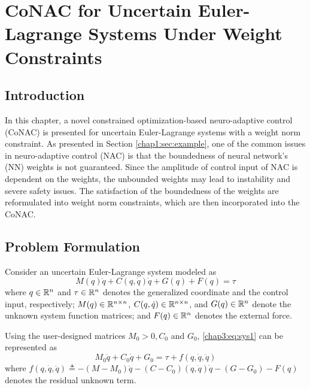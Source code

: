 
\chapter{
    CoNAC for Uncertain Euler-Lagrange Systems Under Weight Constraints
} \label{chapter3}

\section{Introduction} 

In this chapter, a novel constrained optimization-based neuro-adaptive control (Co\allowbreak NAC) is presented for uncertain Euler-Lagrange systems with a weight norm constraint. 
As presented in Section \ref{chap1:sec:example}, one of the common issues in neuro-adaptive control (NAC) is that the boundedness of neural network’s (NN) weights is not guaranteed.
Since the amplitude of control input of NAC is dependent on the weights, the unbounded weights may lead to instability and severe safety issues. 
The satisfaction of the boundedness of the weights are reformulated into weight norm constraints, which are then incorporated into the CoNAC.

\section{Problem Formulation}

Consider an uncertain Euler-Lagrange system modeled as
\begin{equation}
    M(q)\ddot q + C(q,\dot q)\dot q + G(q) + F(q) = \tau
    \label{chap3:eq:sys1}
\end{equation}
where $q\in \mathbb{R}^n$ and $\tau\in\mathbb{R}^n$ denotes the generalized coordinate and the control input, respectively; $M(q)\in\mathbb{R}^{n\times n}$, $C(q,\dot q)\in\mathbb{R}^{n\times n}$, and $G(q)\in\mathbb{R}^{n}$ denote the unknown system function matrices; and $F(q)\in\mathbb{R}^{n}$ denotes the external force.

Using the user-designed matrices $M_0>0,C_0$ and $G_0$, \eqref{chap3:eq:sys1} can be represented as 
\begin{equation}
    M_0\ddot q+C_0\dot q+G_0 = \tau + f(q,\dot q,\ddot q)
    \label{chap3:eq:sys2}
\end{equation}
where $f(q,\dot q,\ddot q) \triangleq -(M-M_0)\ddot q-(C-C_0)(q,\dot q)\dot q -(G-G_0) -F(q)$ denotes the residual unknown term.

